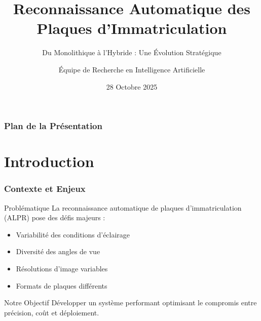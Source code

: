 \documentclass[
	11pt,
	aspectratio=169,
]{beamer}
\title[ALPR]{Reconnaissance Automatique des Plaques d'Immatriculation}
\subtitle{Du Monolithique à l'Hybride : Une Évolution Stratégique}
\author[Équipe IA]{Équipe de Recherche en Intelligence Artificielle}
\institute[UATM]{
	UATM GASA FORMATION\\
	\smallskip
	\textit{info@uatm-gasa.com}
}
\date[28 Oct 2025]{28 Octobre 2025}
\begin{document}

\begin{frame}
	\titlepage
\end{frame}


\begin{frame}
	\frametitle{Plan de la Présentation}
	\tableofcontents
\end{frame}


\section{Introduction}

\begin{frame}
	\frametitle{Contexte et Enjeux}
	
	\begin{block}{Problématique}
		La reconnaissance automatique de plaques d'immatriculation (ALPR) pose des défis majeurs :
		\begin{itemize}
			\item Variabilité des conditions d'éclairage
			\item Diversité des angles de vue
			\item Résolutions d'image variables
			\item Formats de plaques différents
		\end{itemize}
	\end{block}
	
	\bigskip
	
	\begin{exampleblock}{Notre Objectif}
		Développer un système performant optimisant le compromis entre précision, coût et déploiement.
	\end{exampleblock}
\end{frame}

\end{document}
